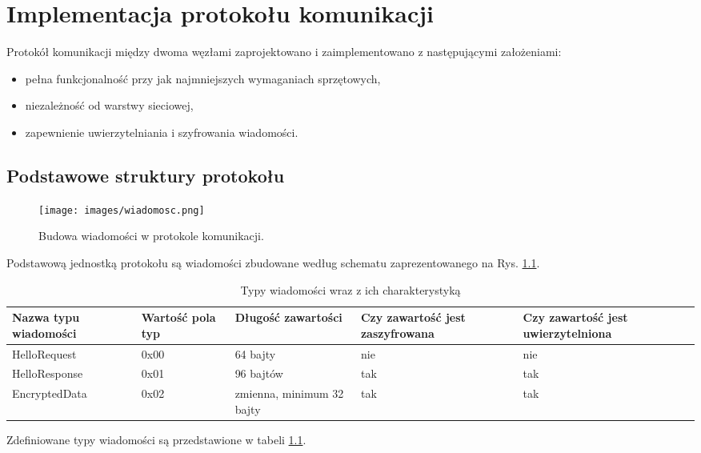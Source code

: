 \chapter{Implementacja protokołu komunikacji}
\label{cha:implementacja}

Protokół komunikacji między dwoma węzłami zaprojektowano i zaimplementowano z następującymi założeniami:

\begin{itemize}
\item pełna funkcjonalność przy jak najmniejszych wymaganiach sprzętowych,
\item niezależność od warstwy sieciowej,
\item zapewnienie uwierzytelniania i szyfrowania wiadomości.
\end{itemize}

\section{Podstawowe struktury protokołu}
\label{sec:proto}

\begin{figure}[h]
\centering
\texttt{[image: images/wiadomosc.png]}
\caption{Budowa wiadomości w protokole komunikacji.}
\label{fig:message-def}
\end{figure}

Podstawową jednostką protokołu są wiadomości zbudowane według schematu zaprezentowanego na Rys. \ref{fig:message-def}.

\begin{table}[t]
\centering
\caption{Typy wiadomości wraz z ich charakterystyką}
\begin{tabular}{|p{2.3cm}|p{1.4cm}|l|p{2.9cm}|p{3.1cm}|}
    \hline
    \textbf{Nazwa typu wiadomości}  &
    \textbf{Wartość pola typ}  &
    \textbf{Długość zawartości}  &
    \textbf{Czy zawartość jest zaszyfrowana}  &
    \textbf{Czy zawartość jest uwierzytelniona}\\
    \hline
    HelloRequest & 0x00 & 64 bajty & nie & nie\\
    \hline
    HelloResponse & 0x01 & 96 bajtów & tak & tak\\
    \hline
    EncryptedData & 0x02 & zmienna, minimum 32 bajty & tak & tak\\
    \hline
\end{tabular}
\label{tab:recordtypes}
\end{table}


Zdefiniowane typy wiadomości są przedstawione w tabeli \ref{tab:recordtypes}.

